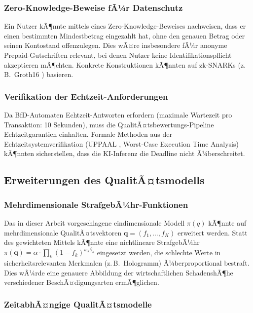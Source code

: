 ﻿\documentclass[a4paper,12pt]{article}
\theoremstyle{definition}
\begin{document}
\subsubsection{Zero-Knowledge-Beweise fÃ¼r Datenschutz}

Ein Nutzer kÃ¶nnte mittels eines Zero-Knowledge-Beweises \cite{goldwasser1989knowledge}
nachweisen, dass er einen bestimmten Mindestbetrag eingezahlt hat, ohne den
genauen Betrag oder seinen Kontostand offenzulegen.
Dies wÃ¤re insbesondere fÃ¼r anonyme Prepaid-Gutschriften relevant,
bei denen Nutzer keine Identifikationspflicht akzeptieren mÃ¶chten.
Konkrete Konstruktionen kÃ¶nnten auf zk-SNARKs (z.\,B.\ Groth16 \cite{groth2016}) basieren.

\subsubsection{Verifikation der Echtzeit-Anforderungen}

Da BfD-Automaten Echtzeit-Antworten erfordern (maximale Wartezeit pro Transaktion:
10 Sekunden), muss die QualitÃ¤tsbewertungs-Pipeline Echtzeitgarantien einhalten.
Formale Methoden aus der Echtzeitsystemverifikation (UPPAAL \cite{behrmann2004uppaal},
Worst-Case Execution Time Analysis) kÃ¶nnten sicherstellen, dass die KI-Inferenz
die Deadline nicht Ã¼berschreitet.

\subsection{Erweiterungen des QualitÃ¤tsmodells}

\subsubsection{Mehrdimensionale StrafgebÃ¼hr-Funktionen}

Das in dieser Arbeit vorgeschlagene eindimensionale Modell $\pi(q)$ kÃ¶nnte
auf mehrdimensionale QualitÃ¤tsvektoren $\mathbf{q} = (f_1,\ldots,f_K)$ erweitert werden.
Statt des gewichteten Mittels kÃ¶nnte eine nichtlineare StrafgebÃ¼hr
$\pi(\mathbf{q}) = \alpha \cdot \prod_k (1-f_k)^{w_k \beta_k}$ eingesetzt werden,
die schlechte Werte in sicherheitsrelevanten Merkmalen (z.\,B.\ Hologramm) Ã¼berproportional
bestraft.  Dies wÃ¼rde eine genauere Abbildung der wirtschaftlichen SchadenshÃ¶he
verschiedener BeschÃ¤digungsarten ermÃ¶glichen.

\subsubsection{ZeitabhÃ¤ngige QualitÃ¤tsmodelle}
\end{document}
